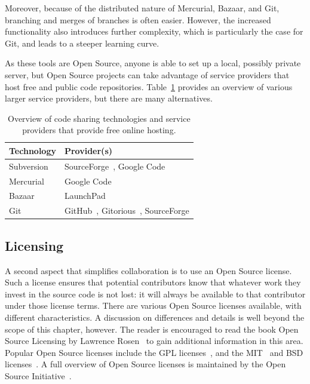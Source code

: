 \documentclass[11pt]{book}
\begin{document}
Moreover, because of the distributed nature of Mercurial, Bazaar, and Git,
branching and merges of branches is often easier. However, the increased
functionality also introduces further complexity, which is particularly
the case for Git, and leads to a steeper learning curve.

As these tools are Open Source, anyone is able to set up a local,
possibly private server, but
Open Source projects can take advantage of service providers that host
free and public code repositories. Table~\ref{tab:cvsProviders}
provides an overview of various larger service providers, but there
are many alternatives.

\begin{table}
\caption{Overview of code sharing technologies and service providers
that provide free online hosting.}
\label{tab:cvsProviders}
\begin{center}
\begin{tabularx}{0.7\textwidth}{ll}
\toprule
\textbf{Technology} & \textbf{Provider(s)} \\
\midrule 
 Subversion & SourceForge~\cite{url:sourceforge}, Google Code~\cite{url:googlecode} \\ 
 Mercurial & Google Code \\ 
 Bazaar & LaunchPad~\cite{url:launchpad} \\ 
 Git & GitHub~\cite{url:github}, Gitorious~\cite{url:gitorious}, SourceForge \\ 
\bottomrule
\end{tabularx}
\end{center}
\end{table}

\subsection{Licensing}

A second aspect that simplifies collaboration is to use an
Open Source license. Such a license ensures that potential
contributors know that whatever work they invest in the source
code is not lost: it will always be available to that
contributor under those license terms.
There are various Open Source licenses available, with
different characteristics. A discussion on differences and
details is well beyond the scope of this chapter, however.
The reader is encouraged to read the book
Open Source Licensing by Lawrence Rosen~\cite{Rosen2004}
to gain additional information in this area.
Popular Open Source licenses include the GPL
licenses~\cite{url:license:lgpl,url:license:gpl}, and
the MIT~\cite{url:license:mit} and BSD licenses~\cite{url:license:bsd}. A full overview of Open
Source licenses is maintained by the Open Source Initiative~\cite{url:osi}.
\end{document}
